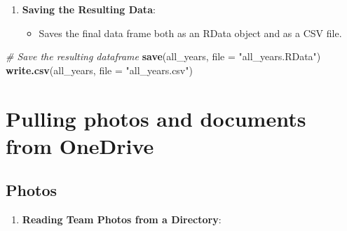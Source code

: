 \documentclass[
]{book}
\newenvironment{Shaded}{\begin{snugshade}}{\end{snugshade}}
\newcommand{\AttributeTok}[1]{\textcolor[rgb]{0.13,0.29,0.53}{#1}}
\newcommand{\CommentTok}[1]{\textcolor[rgb]{0.56,0.35,0.01}{\textit{#1}}}
\newcommand{\ConstantTok}[1]{\textcolor[rgb]{0.56,0.35,0.01}{#1}}
\newcommand{\FunctionTok}[1]{\textcolor[rgb]{0.13,0.29,0.53}{\textbf{#1}}}
\newcommand{\NormalTok}[1]{#1}
\newcommand{\OtherTok}[1]{\textcolor[rgb]{0.56,0.35,0.01}{#1}}
\newcommand{\SpecialCharTok}[1]{\textcolor[rgb]{0.81,0.36,0.00}{\textbf{#1}}}
\newcommand{\StringTok}[1]{\textcolor[rgb]{0.31,0.60,0.02}{#1}}
\providecommand{\tightlist}{%
  \setlength{\itemsep}{0pt}\setlength{\parskip}{0pt}}
\theoremstyle{definition}
\theoremstyle{definition}
\theoremstyle{definition}
\theoremstyle{definition}
\theoremstyle{remark}
\begin{document}
\begin{enumerate}
\def\labelenumi{\arabic{enumi}.}
\setcounter{enumi}{9}
\tightlist
\item
  \textbf{Saving the Resulting Data}:

  \begin{itemize}
  \tightlist
  \item
    Saves the final data frame both as an RData object and as a CSV file.
  \end{itemize}
\end{enumerate}

\begin{Shaded}
\begin{Highlighting}[]
\CommentTok{\# Save the resulting dataframe}
\FunctionTok{save}\NormalTok{(all\_years, }\AttributeTok{file =} \StringTok{"all\_years.RData"}\NormalTok{)}
\FunctionTok{write.csv}\NormalTok{(all\_years, }\AttributeTok{file =} \StringTok{"all\_years.csv"}\NormalTok{)}
\end{Highlighting}
\end{Shaded}

\hypertarget{pulling-photos-and-documents-from-onedrive}{%
\section{Pulling photos and documents from OneDrive}\label{pulling-photos-and-documents-from-onedrive}}

\hypertarget{photos}{%
\subsection{Photos}\label{photos}}

\begin{enumerate}
\def\labelenumi{\arabic{enumi}.}
\tightlist
\item
  \textbf{Reading Team Photos from a Directory}:
\end{enumerate}

\begin{Shaded}
\end{Shaded}
\end{document}
